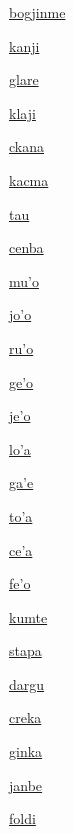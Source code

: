 {\hyperlink{val:bogjinme}{bogjinme}}{}{}{}

{\hyperlink{val:kanji}{kanji}}{}{}{}

{\hyperlink{val:glare}{glare}}{}{}{}

{\hyperlink{val:klaji}{klaji}}{}{}{}

{\hyperlink{val:ckana}{ckana}}{}{}{}

{\hyperlink{val:kacma}{kacma}}{}{}{}

{\hyperlink{val:tau}{tau}}{}{}{}

{\hyperlink{val:cenba}{cenba}}{}{}{}

{\hyperlink{val:muho}{mu'o}}{}{}{}

{\hyperlink{val:joho}{jo'o}}{}{}{}

{\hyperlink{val:ruho}{ru'o}}{}{}{}

{\hyperlink{val:geho}{ge'o}}{}{}{}

{\hyperlink{val:jeho}{je'o}}{}{}{}

{\hyperlink{val:loha}{lo'a}}{}{}{}

{\hyperlink{val:gahe}{ga'e}}{}{}{}

{\hyperlink{val:toha}{to'a}}{}{}{}

{\hyperlink{val:ceha}{ce'a}}{}{}{}

{\hyperlink{val:feho}{fe'o}}{}{}{}

{\hyperlink{val:kumte}{kumte}}{}{}{}

{\hyperlink{val:stapa}{stapa}}{}{}{}

{\hyperlink{val:dargu}{dargu}}{}{}{}

{\hyperlink{val:creka}{creka}}{}{}{}

{\hyperlink{val:ginka}{ginka}}{}{}{}

{\hyperlink{val:janbe}{janbe}}{}{}{}

{\hyperlink{val:foldi}{foldi}}{}{}{}

